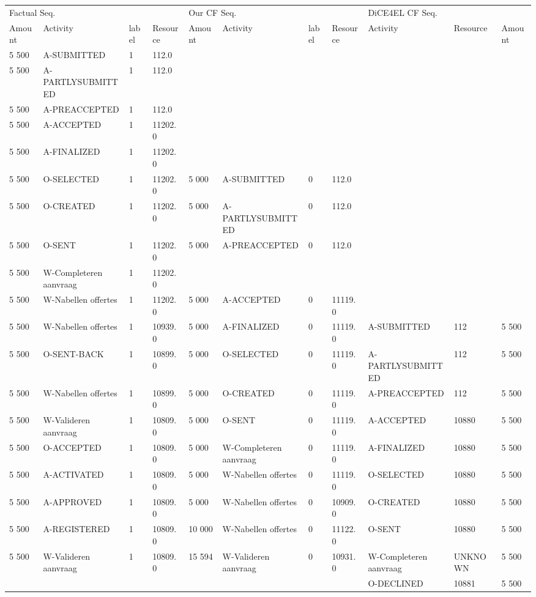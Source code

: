 \begin{tabular}{lllllllllll}
\toprule
\multicolumn{4}{l}{Factual Seq.} & \multicolumn{4}{l}{Our CF Seq.} & \multicolumn{3}{l}{DiCE4EL CF Seq.} \\
Amount & Activity & label & Resource & Amount & Activity & label & Resource & Activity & Resource & Amount \\
\midrule
5 500 & A-SUBMITTED & 1 & 112.0 &  &  &  &  &  &  &  \\
5 500 & A-PARTLYSUBMITTED & 1 & 112.0 &  &  &  &  &  &  &  \\
5 500 & A-PREACCEPTED & 1 & 112.0 &  &  &  &  &  &  &  \\
5 500 & A-ACCEPTED & 1 & 11202.0 &  &  &  &  &  &  &  \\
5 500 & A-FINALIZED & 1 & 11202.0 &  &  &  &  &  &  &  \\
5 500 & O-SELECTED & 1 & 11202.0 & 5 000 & A-SUBMITTED & 0 & 112.0 &  &  &  \\
5 500 & O-CREATED & 1 & 11202.0 & 5 000 & A-PARTLYSUBMITTED & 0 & 112.0 &  &  &  \\
5 500 & O-SENT & 1 & 11202.0 & 5 000 & A-PREACCEPTED & 0 & 112.0 &  &  &  \\
5 500 & W-Completeren aanvraag & 1 & 11202.0 &  &  &  &  &  &  &  \\
5 500 & W-Nabellen offertes & 1 & 11202.0 & 5 000 & A-ACCEPTED & 0 & 11119.0 &  &  &  \\
5 500 & W-Nabellen offertes & 1 & 10939.0 & 5 000 & A-FINALIZED & 0 & 11119.0 & A-SUBMITTED & 112 & 5 500 \\
5 500 & O-SENT-BACK & 1 & 10899.0 & 5 000 & O-SELECTED & 0 & 11119.0 & A-PARTLYSUBMITTED & 112 & 5 500 \\
5 500 & W-Nabellen offertes & 1 & 10899.0 & 5 000 & O-CREATED & 0 & 11119.0 & A-PREACCEPTED & 112 & 5 500 \\
5 500 & W-Valideren aanvraag & 1 & 10809.0 & 5 000 & O-SENT & 0 & 11119.0 & A-ACCEPTED & 10880 & 5 500 \\
5 500 & O-ACCEPTED & 1 & 10809.0 & 5 000 & W-Completeren aanvraag & 0 & 11119.0 & A-FINALIZED & 10880 & 5 500 \\
5 500 & A-ACTIVATED & 1 & 10809.0 & 5 000 & W-Nabellen offertes & 0 & 11119.0 & O-SELECTED & 10880 & 5 500 \\
5 500 & A-APPROVED & 1 & 10809.0 & 5 000 & W-Nabellen offertes & 0 & 10909.0 & O-CREATED & 10880 & 5 500 \\
5 500 & A-REGISTERED & 1 & 10809.0 & 10 000 & W-Nabellen offertes & 0 & 11122.0 & O-SENT & 10880 & 5 500 \\
5 500 & W-Valideren aanvraag & 1 & 10809.0 & 15 594 & W-Valideren aanvraag & 0 & 10931.0 & W-Completeren aanvraag & UNKNOWN & 5 500 \\
 &  &  &  &  &  &  &  & O-DECLINED & 10881 & 5 500 \\
\bottomrule
\end{tabular}
